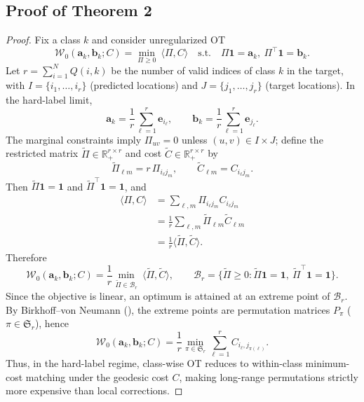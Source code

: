\documentclass[journal,twoside,web]{ieeecolor}
\begin{document}
\subsection{Proof of Theorem 2}
\label{proof:theorem_2}
\begin{proof}
Fix a class $k$ and consider unregularized OT
\begin{equation}
\mathcal{W}_{0}(\mathbf{a}_k,\mathbf{b}_k;C)
=
\min_{\Pi\ge 0}\ \langle \Pi, C\rangle
\quad
\text{s.t.}\quad
\Pi\mathbf{1}=\mathbf{a}_k,\ \Pi^\top\mathbf{1}=\mathbf{b}_k .
\label{eq:w0_def_em}
\end{equation}
Let $r=\sum_{i=1}^{N}Q(i,k)$ be the number of valid indices of class $k$ in the target, with $I=\{i_1,\ldots,i_r\}$ (predicted locations) and $J=\{j_1,\ldots,j_r\}$ (target locations). In the hard-label limit,
\begin{equation}
\mathbf{a}_k=\frac{1}{r}\sum_{\ell=1}^{r}\mathbf{e}_{i_\ell},
\qquad
\mathbf{b}_k=\frac{1}{r}\sum_{\ell=1}^{r}\mathbf{e}_{j_\ell}.
\label{eq:hard_masses_em}
\end{equation}
The marginal constraints imply $\Pi_{uv}=0$ unless $(u,v)\in I\times J$; define the restricted matrix $\widetilde{\Pi}\in\mathbb{R}_+^{r\times r}$ and cost $\widetilde{C}\in\mathbb{R}_+^{r\times r}$ by
\begin{equation}
\widetilde{\Pi}_{\ell m}=r\,\Pi_{i_\ell j_m},
\qquad
\widetilde{C}_{\ell m}=C_{i_\ell j_m}.
\label{eq:restrict_em}
\end{equation}
Then $\widetilde{\Pi}\mathbf{1}=\mathbf{1}$ and $\widetilde{\Pi}^\top\mathbf{1}=\mathbf{1}$, and
\begin{align}
\langle \Pi, C\rangle
&=
\sum_{\ell,m}\Pi_{i_\ell j_m}C_{i_\ell j_m} \\
&=
\frac{1}{r}\sum_{\ell,m}\widetilde{\Pi}_{\ell m}\widetilde{C}_{\ell m} \\
&=
\frac{1}{r}\langle \widetilde{\Pi},\widetilde{C}\rangle.
\label{eq:obj_reduce_em}
\end{align}
Therefore
\begin{equation}
\mathcal{W}_{0}(\mathbf{a}_k,\mathbf{b}_k;C)
=
\frac{1}{r}\min_{\widetilde{\Pi}\in\mathcal{B}_r}\ \langle \widetilde{\Pi},\widetilde{C}\rangle,
\qquad
\mathcal{B}_r=\{\widetilde{\Pi}\ge 0:\widetilde{\Pi}\mathbf{1}=\mathbf{1},\ \widetilde{\Pi}^\top\mathbf{1}=\mathbf{1}\}.
\label{eq:birkhoff_em}
\end{equation}
Since the objective is linear, an optimum is attained at an extreme point of $\mathcal{B}_r$. By Birkhoff--von Neumann (\cite{von1953certain}), the extreme points are permutation matrices $P_\pi$ ($\pi\in\mathfrak{S}_r$), hence
\begin{equation}
\mathcal{W}_{0}(\mathbf{a}_k,\mathbf{b}_k;C)
=
\frac{1}{r}\min_{\pi\in\mathfrak{S}_r}\sum_{\ell=1}^{r} C_{i_\ell, j_{\pi(\ell)}}.
\label{eq:assignment_em}
\end{equation}
Thus, in the hard-label regime, class-wise OT reduces to within-class minimum-cost matching under the geodesic cost $C$, making long-range permutations strictly more expensive than local corrections.
\end{proof}
\end{document}
